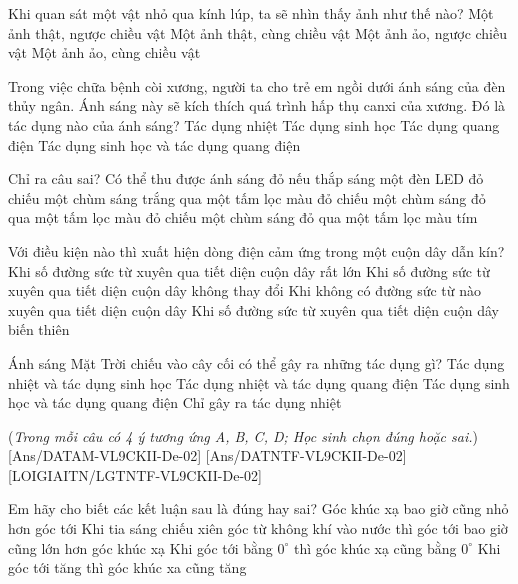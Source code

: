 \begin{ex}
	Khi quan sát một vật nhỏ qua kính lúp, ta sẽ nhìn thấy ảnh như thế nào?
	\choice
	{Một ảnh thật, ngược chiều vật}
	{Một ảnh thật, cùng chiều vật}
	{Một ảnh ảo, ngược chiều vật}
	{\True Một ảnh ảo, cùng chiều vật}
	\loigiai{}
\end{ex}

\begin{ex}
	Trong việc chữa bệnh còi xương, người ta cho trẻ em ngồi dưới ánh sáng của đèn thủy ngân. Ánh sáng này sẽ kích thích quá trình hấp thụ canxi của xương. Đó là tác dụng nào của ánh sáng?
	\choice
	{Tác dụng nhiệt}
	{\True Tác dụng sinh học}
	{Tác dụng quang điện}
	{Tác dụng sinh học và tác dụng quang điện}
	\loigiai{}
\end{ex}

\begin{ex}
	Chỉ ra câu sai?
	Có thể thu được ánh sáng đỏ nếu
	\choice
	{thắp sáng một đèn LED đỏ}
	{chiếu một chùm sáng trắng qua một tấm lọc màu đỏ}
	{chiếu một chùm sáng đỏ qua một tấm lọc màu đỏ}
	{\True chiếu một chùm sáng đỏ qua một tấm lọc màu tím}
	\loigiai{}
\end{ex}

\begin{ex}
	Với điều kiện nào thì xuất hiện dòng điện cảm ứng trong một cuộn dây dẫn kín?
	\choice
	{Khi số đường sức từ xuyên qua tiết diện cuộn dây rất lớn}
	{Khi số đường sức từ xuyên qua tiết diện cuộn dây không thay đổi}
	{Khi không có đường sức từ nào xuyên qua tiết diện cuộn dây}
	{\True Khi số đường sức từ xuyên qua tiết diện cuộn dây biến thiên}
	\loigiai{}
\end{ex}

\begin{ex}
	Ánh sáng Mặt Trời chiếu vào cây cối có thể gây ra những tác dụng gì?
	\choice
	{\True Tác dụng nhiệt và tác dụng sinh học}
	{Tác dụng nhiệt và tác dụng quang điện}
	{Tác dụng sinh học và tác dụng quang điện}
	{Chỉ gây ra tác dụng nhiệt}
	\loigiai{}
\end{ex}


(\textit{Trong mỗi câu có 4 ý tương ứng A, B, C, D; Học sinh chọn đúng hoặc sai.})
[Ans/DATAM-VL9CKII-De-02]
[Ans/DATNTF-VL9CKII-De-02]
\LGexTF
[LOIGIAITN/LGTNTF-VL9CKII-De-02]
\begin{ex}
	Em hãy cho biết các kết luận sau là đúng hay sai?
	\choiceTF
	{Góc khúc xạ bao giờ cũng nhỏ hơn góc tới}
	{\True Khi tia sáng chiếu xiên góc từ không khí vào nước thì góc tới bao giờ cũng lớn hơn góc khúc xạ}
	{\True Khi góc tới bằng $0^{\circ}$ thì góc khúc xạ cũng bằng $0^{\circ}$}
	{\True Khi góc tới tăng thì góc khúc xa cũng tăng}
	\loigiai{}
\end{ex}

